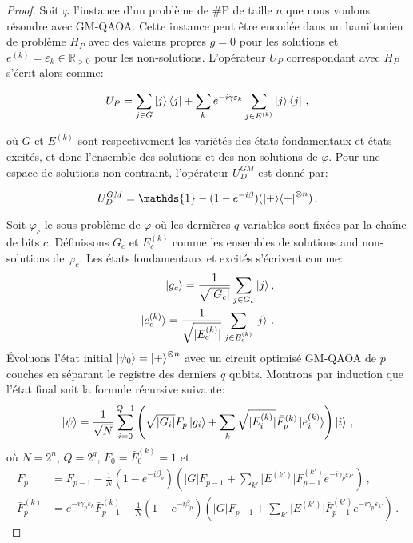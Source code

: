 \begin{proof}
    
Soit $\varphi$ l'instance d'un problème de \textsf{\#P} de taille $n$ que nous voulons résoudre avec GM-QAOA. Cette instance peut être encodée dans un hamiltonien de problème $H_{P}$ avec des valeurs propres $g = 0$ pour les solutions et $e^{(k)} = \varepsilon_{k} \in \mathbb{R}_{>0}$ pour les non-solutions. L'opérateur $U_{P}$ correspondant avec $H_{P}$ s'écrit alors comme:

\begin{equation}
    U_{P} = \sum_{j \in G} \ket{j}\bra{j} + \sum_{k} e^{-i \gamma \varepsilon_{k}} \sum_{j \in E^{(k)}} \ket{j}\bra{j} \,,
\end{equation} 

où $G$ et $E^{(k)}$ sont respectivement les variétés des états fondamentaux et états excités, et donc l'ensemble des solutions et des non-solutions de $\varphi$. Pour une espace de solutions non contraint, l'opérateur $U_{D}^{GM}$ est donné par:

\begin{equation}
    U_{D}^{GM} = \mathds{1} - (1 - e^{-i\beta}) (\ket{+}\!\bra{+}^{\otimes n}) \,.
\end{equation}

Soit $\varphi_{c}$ le sous-problème de $\varphi$ où les dernières $q$ variables sont fixées par la chaîne de bits $c$. Définissons $G_{c}$ et $E_{c}^{(k)}$ comme les ensembles de solutions and non-solutions de $\varphi_{c}$. Les états fondamentaux et excités s'écrivent comme:
\begin{align}
    \ket{g_{c}} = \frac{1}{\sqrt{ \lvert G_{c} \rvert }} \sum_{j \in G_{c}} \ket{j}, \\
    \ket{e^{(k)}_{c}} = \frac{1}{\sqrt{ \lvert E^{(k)}_{c} \rvert }} \sum_{j \in E^{(k)}_{c}} \ket{j} \,.
\end{align}
Évoluons l'état initial $\ket{\psi_{0}} = \ket{+}^{\otimes n}$ avec un circuit optimisé GM-QAOA de $p$ couches en séparant le registre des derniers $q$ qubits. Montrons par induction que l'état final suit la formule récursive suivante:
\begin{equation}
    \label{eq:recursive-formula}
    \ket{\psi} = \frac{1}{\sqrt{ N }} \sum_{i=0}^{Q-1} \left( \sqrt{ \lvert G_{i} \rvert } F_{p} \ket{g_{i}} + \sum_{k} \sqrt{ \lvert E^{(k)}_{i} \rvert } \bar{F}^{(k)}_{p} \ket{e^{(k)}_{i}} \right) \ket{i} \,,
\end{equation}
où $N=2^{n}$, $Q=2^{q}$, $F_{0}=\bar{F}_{0}^{(k)}=1$ et
\begin{align}
    F_{p} &= F_{p-1} - \frac{1}{N} (1-e^{-i\beta_{p}}) \left( \lvert G \rvert   F_{p-1} + \sum_{k'} \lvert E^{(k')} \rvert \bar{F}^{(k')}_{p-1} e^{-i\gamma_{p}\varepsilon_{k'}} \right) \,, \\
    \bar{F}^{(k)}_{p} &= e^{-i\gamma_{p} \varepsilon_{k}}\bar{F}_{p-1}^{(k)} - \frac{1}{N} (1-e^{-i\beta_{p}}) \left( \lvert G \rvert   F_{p-1} + \sum_{k'} \lvert E^{(k')} \rvert \bar{F}^{(k')}_{p-1} e^{-i\gamma_{p}\varepsilon_{k'}} \right) \,.
\end{align}


\end{proof}

